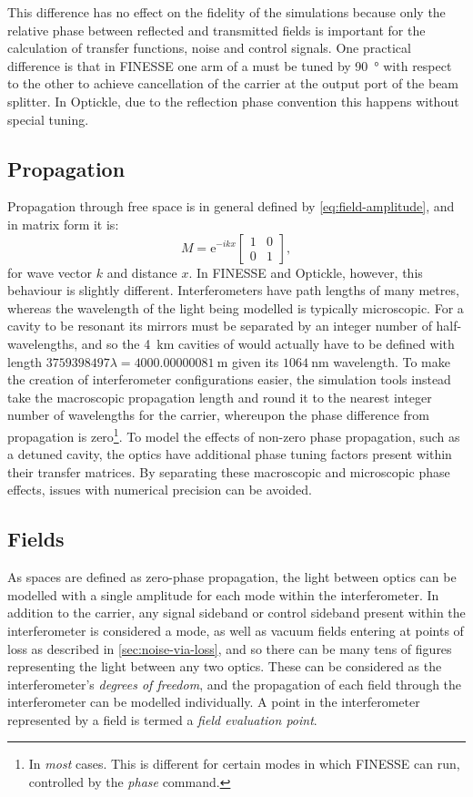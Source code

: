 This difference has no effect on the fidelity of the simulations because only the relative phase between reflected and transmitted fields is important for the calculation of transfer functions, noise and control signals. One practical difference is that in \gls{FINESSE} one arm of a \MI{} must be tuned by \SI{90}{\degree} with respect to the other to achieve cancellation of the carrier at the output port of the beam splitter. In Optickle, due to the reflection phase convention this happens without special tuning.

\subsection{Propagation}
Propagation through free space is in general defined by \cref{eq:field-amplitude}, and in matrix form it is:
\begin{equation}
  M = \text{e}^{-ikx}
  \begin{bmatrix}
    1 & 0 \\
    0 & 1
  \end{bmatrix}
  ,
\end{equation}
for wave vector $k$ and distance $x$. In \gls{FINESSE} and Optickle, however, this behaviour is slightly different. Interferometers have path lengths of many metres, whereas the wavelength of the light being modelled is typically microscopic. For a cavity to be resonant its mirrors must be separated by an integer number of half-wavelengths, and so the \SI{4}{\kilo\meter} \FP{} cavities of \ALIGO{} would actually have to be defined with length $\num{3759398497}\lambda = \SI{4000.00000081}{\meter}$ given its $\SI{1064}{\nano\meter}$ wavelength. To make the creation of interferometer configurations easier, the simulation tools instead take the macroscopic propagation length and round it to the nearest integer number of wavelengths for the carrier, whereupon the phase difference from propagation is zero\footnote{In \emph{most} cases. This is different for certain modes in which \gls{FINESSE} can run, controlled by the \emph{phase} command.}. To model the effects of non-zero phase propagation, such as a detuned cavity, the optics have additional phase tuning factors present within their transfer matrices. By separating these macroscopic and microscopic phase effects, issues with numerical precision can be avoided.

\subsection{Fields}
As spaces are defined as zero-phase propagation, the light between optics can be modelled with a single amplitude for each mode within the interferometer. In addition to the carrier, any signal sideband or control sideband present within the interferometer is considered a mode, as well as vacuum fields entering at points of loss as described in \cref{sec:noise-via-loss}, and so there can be many tens of figures representing the light between any two optics. These can be considered as the interferometer's \emph{degrees of freedom}, and the propagation of each field through the interferometer can be modelled individually. A point in the interferometer represented by a field is termed a \emph{field evaluation point}.

